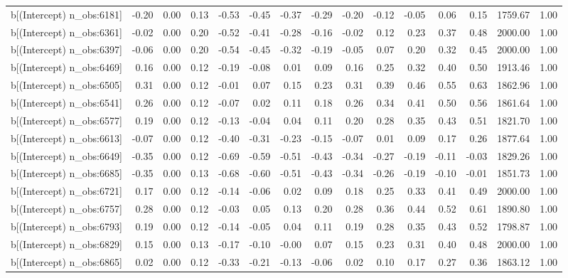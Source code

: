 \begin{table}[ht]
\begin{tabular}{rrrrrrrrrrrrrrr}
  b[(Intercept) n\_obs:6181] & -0.20 & 0.00 & 0.13 & -0.53 & -0.45 & -0.37 & -0.29 & -0.20 & -0.12 & -0.05 & 0.06 & 0.15 & 1759.67 & 1.00 \\ 
  b[(Intercept) n\_obs:6361] & -0.02 & 0.00 & 0.20 & -0.52 & -0.41 & -0.28 & -0.16 & -0.02 & 0.12 & 0.23 & 0.37 & 0.48 & 2000.00 & 1.00 \\ 
  b[(Intercept) n\_obs:6397] & -0.06 & 0.00 & 0.20 & -0.54 & -0.45 & -0.32 & -0.19 & -0.05 & 0.07 & 0.20 & 0.32 & 0.45 & 2000.00 & 1.00 \\ 
  b[(Intercept) n\_obs:6469] & 0.16 & 0.00 & 0.12 & -0.19 & -0.08 & 0.01 & 0.09 & 0.16 & 0.25 & 0.32 & 0.40 & 0.50 & 1913.46 & 1.00 \\ 
  b[(Intercept) n\_obs:6505] & 0.31 & 0.00 & 0.12 & -0.01 & 0.07 & 0.15 & 0.23 & 0.31 & 0.39 & 0.46 & 0.55 & 0.63 & 1862.96 & 1.00 \\ 
  b[(Intercept) n\_obs:6541] & 0.26 & 0.00 & 0.12 & -0.07 & 0.02 & 0.11 & 0.18 & 0.26 & 0.34 & 0.41 & 0.50 & 0.56 & 1861.64 & 1.00 \\ 
  b[(Intercept) n\_obs:6577] & 0.19 & 0.00 & 0.12 & -0.13 & -0.04 & 0.04 & 0.11 & 0.20 & 0.28 & 0.35 & 0.43 & 0.51 & 1821.70 & 1.00 \\ 
  b[(Intercept) n\_obs:6613] & -0.07 & 0.00 & 0.12 & -0.40 & -0.31 & -0.23 & -0.15 & -0.07 & 0.01 & 0.09 & 0.17 & 0.26 & 1877.64 & 1.00 \\ 
  b[(Intercept) n\_obs:6649] & -0.35 & 0.00 & 0.12 & -0.69 & -0.59 & -0.51 & -0.43 & -0.34 & -0.27 & -0.19 & -0.11 & -0.03 & 1829.26 & 1.00 \\ 
  b[(Intercept) n\_obs:6685] & -0.35 & 0.00 & 0.13 & -0.68 & -0.60 & -0.51 & -0.43 & -0.34 & -0.26 & -0.19 & -0.10 & -0.01 & 1851.73 & 1.00 \\ 
  b[(Intercept) n\_obs:6721] & 0.17 & 0.00 & 0.12 & -0.14 & -0.06 & 0.02 & 0.09 & 0.18 & 0.25 & 0.33 & 0.41 & 0.49 & 2000.00 & 1.00 \\ 
  b[(Intercept) n\_obs:6757] & 0.28 & 0.00 & 0.12 & -0.03 & 0.05 & 0.13 & 0.20 & 0.28 & 0.36 & 0.44 & 0.52 & 0.61 & 1890.80 & 1.00 \\ 
  b[(Intercept) n\_obs:6793] & 0.19 & 0.00 & 0.12 & -0.14 & -0.05 & 0.04 & 0.11 & 0.19 & 0.28 & 0.35 & 0.43 & 0.52 & 1798.87 & 1.00 \\ 
  b[(Intercept) n\_obs:6829] & 0.15 & 0.00 & 0.13 & -0.17 & -0.10 & -0.00 & 0.07 & 0.15 & 0.23 & 0.31 & 0.40 & 0.48 & 2000.00 & 1.00 \\ 
  b[(Intercept) n\_obs:6865] & 0.02 & 0.00 & 0.12 & -0.33 & -0.21 & -0.13 & -0.06 & 0.02 & 0.10 & 0.17 & 0.27 & 0.36 & 1863.12 & 1.00 \\ 

\end{tabular}
\end{table}
